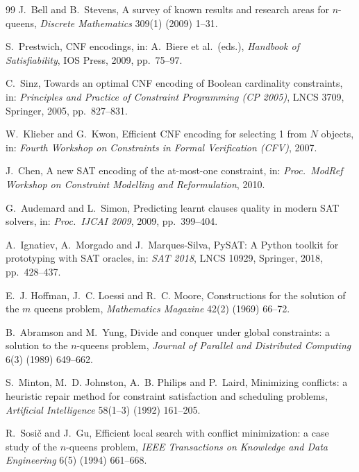 \documentclass[a4paper,fleqn]{cas-sc}
\begin{document}
\begin{thebibliography}{99}
J.~Bell and B.~Stevens, A survey of known results and research areas for $n$-queens, \emph{Discrete Mathematics} 309(1) (2009) 1--31.

S.~Prestwich, CNF encodings, in: A.~Biere et al.\ (eds.), \emph{Handbook of Satisfiability}, IOS Press, 2009, pp.~75--97.

C.~Sinz, Towards an optimal CNF encoding of Boolean cardinality constraints, in: \emph{Principles and Practice of Constraint Programming (CP 2005)}, LNCS 3709, Springer, 2005, pp.~827--831.

W.~Klieber and G.~Kwon, Efficient CNF encoding for selecting 1 from $N$ objects, in: \emph{Fourth Workshop on Constraints in Formal Verification (CFV)}, 2007.

J.~Chen, A new SAT encoding of the at-most-one constraint, in: \emph{Proc.\ ModRef Workshop on Constraint Modelling and Reformulation}, 2010.

G.~Audemard and L.~Simon, Predicting learnt clauses quality in modern SAT solvers, in: \emph{Proc.\ IJCAI 2009}, 2009, pp.~399--404.

A.~Ignatiev, A.~Morgado and J.~Marques-Silva, PySAT: A Python toolkit for prototyping with SAT oracles, in: \emph{SAT 2018}, LNCS 10929, Springer, 2018, pp.~428--437.

E.~J. Hoffman, J.~C. Loessi and R.~C. Moore, Constructions for the solution of the $m$ queens problem, \emph{Mathematics Magazine} 42(2) (1969) 66--72.

B.~Abramson and M.~Yung, Divide and conquer under global constraints: a solution to the $n$-queens problem, \emph{Journal of Parallel and Distributed Computing} 6(3) (1989) 649--662.

S.~Minton, M.~D. Johnston, A.~B. Philips and P.~Laird, Minimizing conflicts: a heuristic repair method for constraint satisfaction and scheduling problems, \emph{Artificial Intelligence} 58(1--3) (1992) 161--205.

R.~Sosi\v{c} and J.~Gu, Efficient local search with conflict minimization: a case study of the $n$-queens problem, \emph{IEEE Transactions on Knowledge and Data Engineering} 6(5) (1994) 661--668.


\end{thebibliography}
\end{document}
